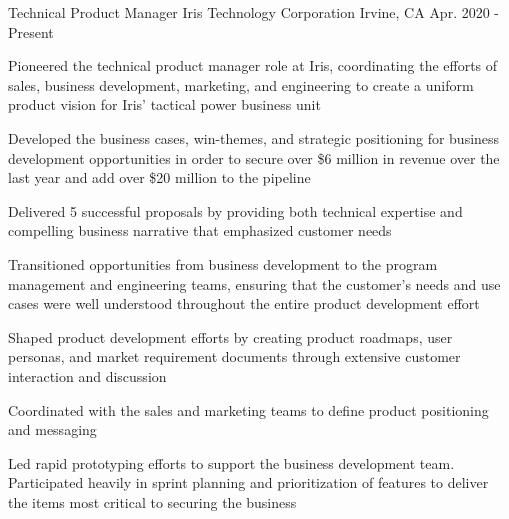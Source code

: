 

\begin{cventries}

  \cventry
    {Technical Product Manager} %
    {Iris Technology Corporation} %
    {Irvine, CA} %
    {Apr. 2020 - Present} %
    {
      \begin{cvitems} %
        \item {Pioneered the technical product manager role at Iris, coordinating the efforts of sales, business development, marketing, and engineering to create a uniform product vision for Iris' tactical power business unit}
        \item {Developed the business cases, win-themes, and strategic positioning for business development opportunities in order to secure over \$6 million in revenue over the last year and add over \$20 million to the pipeline}
        \item {Delivered 5 successful proposals by providing both technical expertise and compelling business narrative that emphasized customer needs}
        \item {Transitioned opportunities from business development to the program management and engineering teams, ensuring that the customer's needs and use cases were well understood throughout the entire product development effort}
        \item {Shaped product development efforts by creating product roadmaps, user personas, and market requirement documents through extensive customer interaction and discussion}
        \item {Coordinated with the sales and marketing teams to define product positioning and messaging}
        \item {Led rapid prototyping efforts to support the business development team. Participated heavily in sprint planning and prioritization of features to deliver the items most critical to securing the business}
      \end{cvitems}
    }


\end{cventries}
